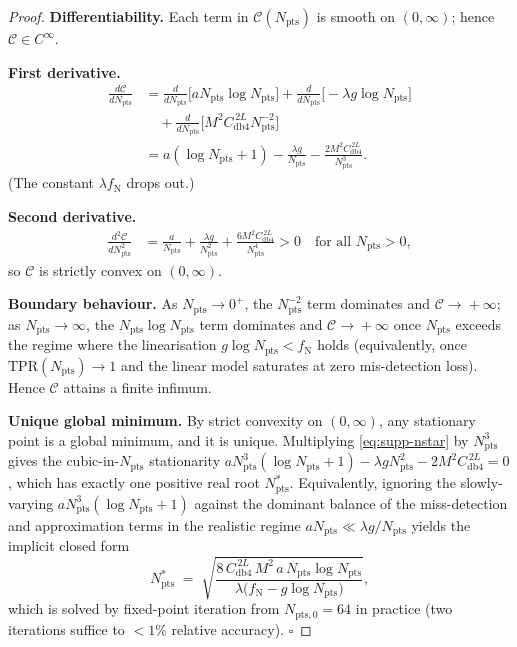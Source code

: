 \documentclass[10pt,twocolumn,a4paper]{article}
\newcommand{\Npts}{N_{\mathrm{pts}}}
\newcommand{\Nstar}{N^{*}_{\mathrm{pts}}}
\newcommand{\TPR}{\mathrm{TPR}}
\begin{document}
\begin{proof}
\textbf{Differentiability.} Each term in $\mathcal{C}(\Npts)$ is
smooth on $(0,\infty)$; hence $\mathcal{C}\in C^{\infty}$.

\textbf{First derivative.}
\begin{align*}
\tfrac{d\mathcal{C}}{d\Npts}
&=\tfrac{d}{d\Npts}\bigl[a\Npts\log\Npts\bigr]
 +\tfrac{d}{d\Npts}\bigl[-\lambda g\log\Npts\bigr]\\
&\quad+\tfrac{d}{d\Npts}\bigl[M^{2}C_{\mathrm{db4}}^{\,2L}\Npts^{-2}\bigr]\\
&=a(\log\Npts+1)-\tfrac{\lambda g}{\Npts}-\tfrac{2M^{2}C_{\mathrm{db4}}^{\,2L}}{\Npts^{3}}.
\end{align*}
(The constant $\lambda f_{\mathrm{N}}$ drops out.)

\textbf{Second derivative.}
\begin{align*}
\tfrac{d^{2}\mathcal{C}}{d\Npts^{2}}
&=\tfrac{a}{\Npts}+\tfrac{\lambda g}{\Npts^{2}}+\tfrac{6M^{2}C_{\mathrm{db4}}^{\,2L}}{\Npts^{4}}>0
\quad\text{for all }\Npts>0,
\end{align*}
so $\mathcal{C}$ is strictly convex on $(0,\infty)$.

\textbf{Boundary behaviour.}
As $\Npts\!\to\!0^{+}$, the $\Npts^{-2}$ term dominates and
$\mathcal{C}\!\to\!+\infty$; as $\Npts\!\to\!\infty$, the
$\Npts\log\Npts$ term dominates and $\mathcal{C}\!\to\!+\infty$ once
$\Npts$ exceeds the regime where the linearisation
$g\log\Npts<f_{\mathrm{N}}$ holds (equivalently, once
$\TPR(\Npts)\!\to\!1$ and the linear model saturates at zero
mis-detection loss). Hence $\mathcal{C}$ attains a finite infimum.

\textbf{Unique global minimum.}
By strict convexity on $(0,\infty)$, any stationary point is a global
minimum, and it is unique. Multiplying \eqref{eq:supp-nstar} by
$\Npts^{3}$ gives the cubic-in-$\Npts$ stationarity
$a\Npts^{3}(\log\Npts+1)-\lambda g\Npts^{2}-2M^{2}C_{\mathrm{db4}}^{\,2L}=0$,
which has exactly one positive real root $\Nstar$. Equivalently,
ignoring the slowly-varying $a\Npts^{3}(\log\Npts+1)$ against the
dominant balance of the miss-detection and approximation terms in the
realistic regime $a\Npts\ll\lambda g/\Npts$ yields the implicit
closed form
\begin{equation}\label{eq:supp-nstar-implicit}
\Nstar\;=\;\sqrt{\frac{8\,C_{\mathrm{db4}}^{\,2L}\,M^{2}\,a\,\Npts\log\Npts}{\lambda\bigl(f_{\mathrm{N}}-g\log\Npts\bigr)}},
\end{equation}
which is solved by fixed-point iteration from $N_{\mathrm{pts},0}=64$ in
practice (two iterations suffice to $<\!1\%$ relative accuracy).
\hfill$\square$
\end{proof}
\end{document}
